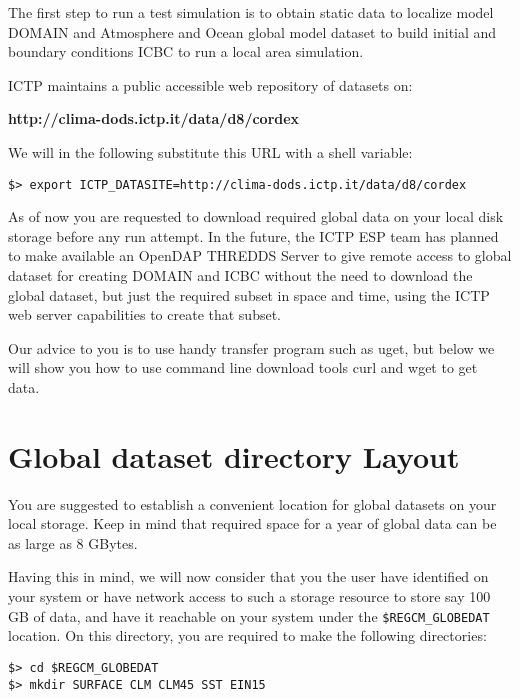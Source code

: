 %
%

The first step to run a test simulation is to obtain static data to localize
model DOMAIN and Atmosphere and Ocean global model dataset to build initial
and boundary conditions ICBC to run a local area simulation.

ICTP maintains a public accessible web repository of datasets on:

{\bf http://clima-dods.ictp.it/data/d8/cordex }

We will in the following substitute this URL with a shell variable:

\begin{Verbatim}
$> export ICTP_DATASITE=http://clima-dods.ictp.it/data/d8/cordex
\end{Verbatim}

As of now you are requested to download required global data on your local disk
storage before any run attempt. In the future, the ICTP ESP team has
planned to make available an OpenDAP THREDDS Server to give remote access
to global dataset for creating DOMAIN and ICBC without the need to
download the global dataset, but just the required subset in space and time,
using the ICTP web server capabilities to create that subset.

Our advice to you is to use handy transfer program such as uget, but below
we will show you how to use command line download tools curl and
wget to get data.

\section{Global dataset directory Layout}

You are suggested to establish a convenient location for global datasets
on your local storage. Keep in mind that required space for a year of global
data can be as large as 8 GBytes.

Having this in mind, we will now consider that you the user have identified
on your system or have network access to such a storage resource to store say
100 GB of data, and have it reachable on your system under the
\verb=$REGCM_GLOBEDAT= location.
On this directory, you are required to make the following directories:

\begin{Verbatim}
$> cd $REGCM_GLOBEDAT
$> mkdir SURFACE CLM CLM45 SST EIN15
\end{Verbatim}


